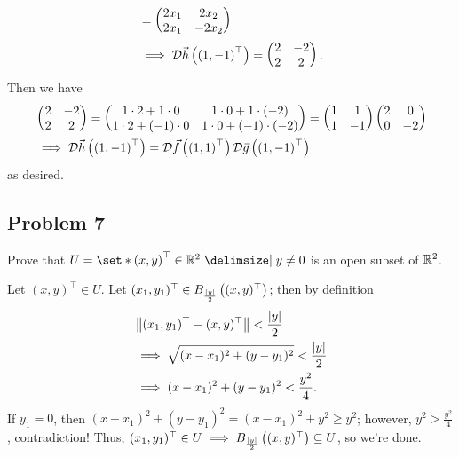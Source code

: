 \documentclass[main.tex]{subfiles}
\begin{document}
\begin{soln}
\begin{align*}
         &= \begin{pmatrix}
            2x_1 & 2x_2 \\
            2x_1 & -2x_2
        \end{pmatrix} \\
        &\implies \mathcal{D}\vec{h}\left( \left( 1, -1 \right)^\top \right) = \begin{pmatrix}
            2 & -2 \\
            2 & 2
        \end{pmatrix}.
    \end{align*}
    Then we have
    \begin{align*}
        &\begin{pmatrix}
            2 & -2 \\
            2 & 2
        \end{pmatrix} = \begin{pmatrix}
            1\cdot 2 + 1\cdot 0 & 1\cdot 0 + 1\cdot (-2) \\
            1\cdot 2 + (-1)\cdot 0 & 1\cdot 0 + (-1)\cdot (-2)
        \end{pmatrix} = \begin{pmatrix}
            1 & 1 \\
            1 & -1
        \end{pmatrix} \begin{pmatrix}
            2 & 0 \\
            0 & -2
        \end{pmatrix} \\
        &\implies \mathcal{D}\vec{h}\left( \left( 1,-1 \right)^\top \right) = \mathcal{D}\vec{f}\left( \left( 1, 1 \right)^\top \right)\mathcal{D}\vec{g}\left( \left( 1,-1 \right)^\top \right)
    \end{align*}
    as desired.
\end{soln}
\eject

\subsection{Problem 7}
\begin{claim}
    Prove that $U = \set*{\parens{x,y}^\top \in \RR^2 \mid y \neq 0}$ is an open subset of $\mathbb R^2$.
\end{claim}

\begin{soln}
    Let $(x, y)^\top \in U$. Let $(x_1, y_1)^\top \in B_{\frac{\left\lvert y \right\rvert}{2}}\left( (x, y)^\top \right)$; then by definition
    \begin{align*}
        &\left\lVert (x_1, y_1)^\top - (x, y)^\top \right\rVert < \frac{\left\lvert y \right\rvert}{2} \\
        &\implies \sqrt{(x - x_1)^2 + (y - y_1)^2} < \frac{\left\lvert y \right\rvert}{2} \\
        &\implies (x - x_1)^2 + (y - y_1)^2 < \frac{y^2}{4}.
    \end{align*}
    If $y_1 = 0$, then $(x - x_1)^2 + (y - y_1)^2 = (x - x_1)^2 + y^2 \ge y^2$; however, $y^2 > \frac{y^2}{4}$, contradiction! Thus, $(x_1, y_1)^\top\in U\implies B_{\frac{\left\lvert y \right\rvert}{2}}\left( (x, y)^\top \right) \subseteq U$, so we're done.
\end{soln}
\eject
\end{document}
